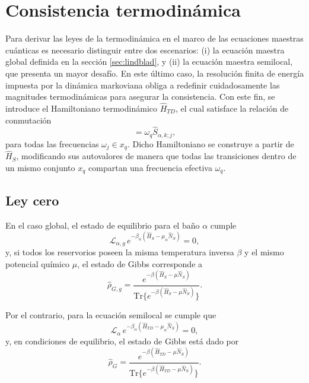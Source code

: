 \section{Consistencia termodinámica}
\label{sec2:thermolaws}

Para derivar las leyes de la termodinámica en el marco de las ecuaciones maestras cuánticas es necesario distinguir entre dos escenarios: 
(i) la ecuación maestra global definida en la sección \ref{sec:lindblad}, y 
(ii) la ecuación maestra semilocal, que presenta un mayor desafío. 
En este último caso, la resolución finita de energía impuesta por la dinámica markoviana obliga a redefinir cuidadosamente las magnitudes termodinámicas para asegurar la consistencia. 
Con este fin, se introduce el Hamiltoniano termodinámico $\hat{H}_{TD}$, el cual satisface la relación de conmutación
\begin{equation*}
    [\hat{S}_{\alpha,k;j},\hat{H}_{TD}] = \omega_{q}\hat{S}_{\alpha,k;j},
\end{equation*}
para todas las frecuencias $\omega_{j} \in x_{q}$. 
Dicho Hamiltoniano se construye a partir de $\hat{H}_{S}$, modificando sus autovalores de manera que todas las transiciones dentro de un mismo conjunto $x_q$ compartan una frecuencia efectiva $\omega_{q}$.

\subsection*{Ley cero}

En el caso global, el estado de equilibrio para el baño $\alpha$ cumple
\begin{equation*}
    \mathcal{L}_{\alpha,g}\,e^{-\beta_{\alpha}(\hat{H}_{S} - \mu_{\alpha}\hat{N}_{S})} = 0,
\end{equation*}
y, si todos los reservorios poseen la misma temperatura inversa $\beta$ y el mismo potencial químico $\mu$, 
el estado de Gibbs corresponde a
\begin{equation*}
    \hat{\rho}_{G,g} = \frac{e^{-\beta(\hat{H}_{S} - \mu \hat{N}_{S})}}{\text{Tr}\{ e^{-\beta(\hat{H}_{S} - \mu \hat{N}_{S})}\}}.
\end{equation*}

Por el contrario, para la ecuación semilocal se cumple que
\begin{equation}
    \mathcal{L}_{\alpha}\,e^{-\beta_{\alpha}(\hat{H}_{TD} - \mu_{\alpha}\hat{N}_{S})} = 0,
    \label{sec2cerolaw}
\end{equation}
y, en condiciones de equilibrio, el estado de Gibbs está dado por
\begin{equation*}
    \hat{\rho}_{G} = \frac{e^{-\beta(\hat{H}_{TD} - \mu \hat{N}_{S})}}{\text{Tr}\{ e^{-\beta(\hat{H}_{TD} - \mu \hat{N}_{S})}\}}.
\end{equation*}


